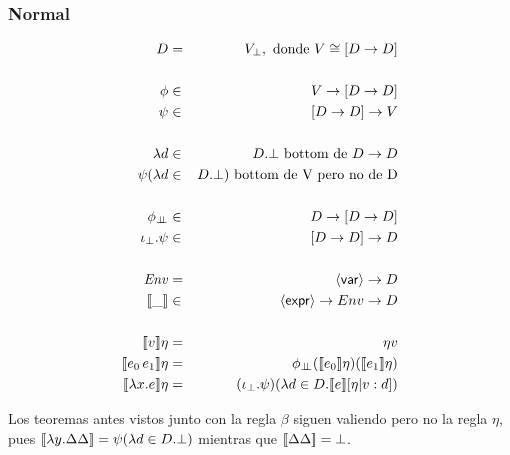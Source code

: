     \subsubsection{Normal}
      \begin{eqnarray*}
        D &=& V_\bot, \text{ donde } V \cong [D \to  D] \\ \\
        \phi &\in& V \to  [D \to  D] \\
        \psi &\in& [D \to  D] \to  V \\ \\ 
        \lambda d &\in& D. \bot \text{ bottom de } D \rightarrow D \\
        \psi(\lambda d &\in& D. \bot) \text{ bottom de V pero no de D} \\ \\
        \phi_{\botbot} &\in& D \to  [D \to  D] \\
        \iota_\bot . \psi &\in& [D \to  D] \to  D \\ \\
        \Env &=& \var \to  D \\
        \llbracket\_\rrbracket &\in& \expr \to  Env \to  D \\ \\
        \llbracket v \rrbracket\eta &=& \eta v \\
        \llbracket e_0\, e_1\rrbracket\eta &=& \phi_{\botbot} (\llbracket e_0\rrbracket\eta) (\llbracket e_1\rrbracket\eta) \\
        \llbracket\lambda x.e\rrbracket\eta &=& (\iota_\bot . \psi)(\lambda d \in D. \llbracket e\rrbracket[\eta|v:d])
      \end{eqnarray*}

      \PN Los teoremas antes vistos junto con la regla $\beta$ siguen valiendo pero no la regla $\eta$, pues $[\![\lambda y. \Delta\Delta]\!] = \psi(\lambda d \in D.\bot)$ mientras que $[\![\Delta\Delta]\!] = \bot$.
    
